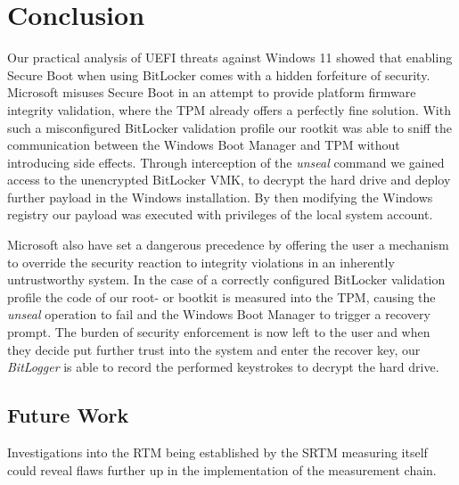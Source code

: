 
\chapter{Conclusion}
\label{sec:conclusion}

Our practical analysis of \ac{UEFI} threats against Windows 11 showed that enabling Secure Boot when using BitLocker comes with a hidden forfeiture of security.
Microsoft misuses Secure Boot in an attempt to provide platform firmware integrity validation, where the \ac{TPM} already offers a perfectly fine solution.
With such a misconfigured BitLocker validation profile our rootkit was able to sniff the communication between the Windows Boot Manager and \ac{TPM} without introducing side effects.
Through interception of the \emph{unseal} command we gained access to the unencrypted BitLocker \ac{VMK}, to decrypt the hard drive and deploy further payload in the Windows installation.
By then modifying the Windows registry our payload was executed with privileges of the local system account.

Microsoft also have set a dangerous precedence by offering the user a mechanism to override the security reaction to integrity violations in an inherently untrustworthy system.
In the case of a correctly configured BitLocker validation profile the code of our root- or bootkit is measured into the \ac{TPM}, causing the \emph{unseal} operation to fail and the Windows Boot Manager to trigger a recovery prompt.
The burden of security enforcement is now left to the user and when they decide put further trust into the system and enter the recover key, our \emph{BitLogger} is able to record the performed keystrokes to decrypt the hard drive.

\section*{Future Work}

Investigations into the \ac{RTM} being established by the \ac{SRTM} measuring itself could reveal flaws further up in the implementation of the measurement chain.